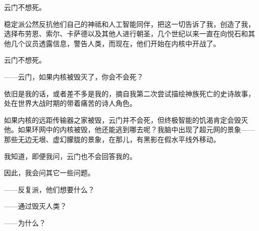 \documentclass[AutoFakeBold=true]{book}
\begin{document}
云门不想死。

稳定派公然反抗他们自己的神祗和人工智能同伴，把这一切告诉了我，创造了我，选择布劳恩、索尔、卡萨德以及其他人进行朝圣，几个世纪以来一直在向悦石和其他几个议员透露信息，警告人类，而现在，他们开始在内核中开战了。

云门不想死。

{\kaishu ——云门，如果内核被毁灭了，你会不会死？}

{}

\vspace*{1em}

依旧是我的话，或者差不多是我的，摘自我第二次尝试描绘神族死亡的史诗故事，处在世界大战时期的带着痛苦的诗人角色。

如果内核的远距传输器之家被毁，云门并不会死，但终极智能的饥渴肯定会毁灭他。如果环网中的内核被毁，他还能逃到哪去呢？我脑中出现了超元网的景象——那些无边无垠、虚幻朦胧的景象，在那儿，有黑影在假水平线外移动。

我知道，即便我问，云门也不会回答我的。

因此，我会问其它一些问题。

{\kaishu ——反复派，他们想要什么？}

{}

{\kaishu ——通过毁灭人类？}

{\heiti [显而易见]}

{\kaishu ——为什么？}
\end{document}
